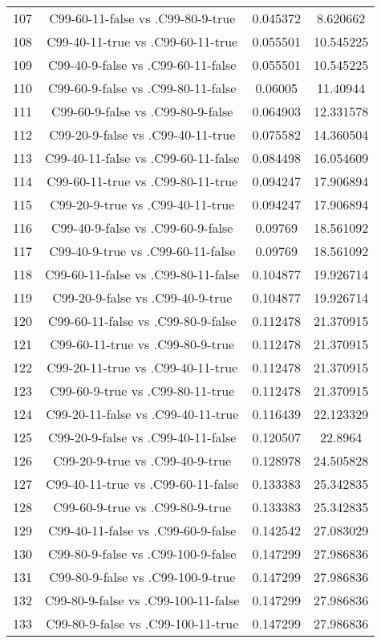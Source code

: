 \documentclass[a4paper,10pt]{article}
\begin{document}
\begin{landscape}
\begin{table}[!htp]
\begin{tabular}{cccc}
107&C99-60-11-false vs .C99-80-9-true&0.045372&8.620662\\
108&C99-40-11-true vs .C99-60-11-true&0.055501&10.545225\\
109&C99-40-9-false vs .C99-60-11-false&0.055501&10.545225\\
110&C99-60-9-false vs .C99-80-11-false&0.06005&11.40944\\
111&C99-60-9-false vs .C99-80-9-false&0.064903&12.331578\\
112&C99-20-9-false vs .C99-40-11-true&0.075582&14.360504\\
113&C99-40-11-false vs .C99-60-11-false&0.084498&16.054609\\
114&C99-60-11-true vs .C99-80-11-true&0.094247&17.906894\\
115&C99-20-9-true vs .C99-40-11-true&0.094247&17.906894\\
116&C99-40-9-false vs .C99-60-9-false&0.09769&18.561092\\
117&C99-40-9-true vs .C99-60-11-false&0.09769&18.561092\\
118&C99-60-11-false vs .C99-80-11-false&0.104877&19.926714\\
119&C99-20-9-false vs .C99-40-9-true&0.104877&19.926714\\
120&C99-60-11-false vs .C99-80-9-false&0.112478&21.370915\\
121&C99-60-11-true vs .C99-80-9-true&0.112478&21.370915\\
122&C99-20-11-true vs .C99-40-11-true&0.112478&21.370915\\
123&C99-60-9-true vs .C99-80-11-true&0.112478&21.370915\\
124&C99-20-11-false vs .C99-40-11-true&0.116439&22.123329\\
125&C99-20-9-false vs .C99-40-11-false&0.120507&22.8964\\
126&C99-20-9-true vs .C99-40-9-true&0.128978&24.505828\\
127&C99-40-11-true vs .C99-60-11-false&0.133383&25.342835\\
128&C99-60-9-true vs .C99-80-9-true&0.133383&25.342835\\
129&C99-40-11-false vs .C99-60-9-false&0.142542&27.083029\\
130&C99-80-9-false vs .C99-100-9-false&0.147299&27.986836\\
131&C99-80-9-false vs .C99-100-9-true&0.147299&27.986836\\
132&C99-80-9-false vs .C99-100-11-false&0.147299&27.986836\\
133&C99-80-9-false vs .C99-100-11-true&0.147299&27.986836\\

\end{tabular}
\end{table}
\end{landscape}
\end{document}
